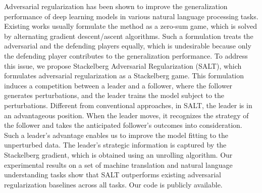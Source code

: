 Adversarial regularization has been shown to improve the generalization performance of deep learning models in various natural language processing tasks. Existing works usually formulate the method as a zero-sum game, which is solved by alternating gradient descent/ascent algorithms. Such a formulation treats the adversarial and the defending players equally, which is undesirable because only the defending player contributes to the generalization performance. To address this issue, we propose Stackelberg Adversarial Regularization (SALT), which formulates adversarial regularization as a Stackelberg game. This formulation induces a competition between a leader and a follower, where the follower generates perturbations, and the leader trains the model subject to the perturbations. Different from conventional approaches, in SALT, the leader is in an advantageous position. When the leader moves, it recognizes the strategy of the follower and takes the anticipated follower's outcomes into consideration. Such a leader's advantage enables us to improve the model fitting to the unperturbed data. The leader's strategic information is captured by the Stackelberg gradient, which is obtained using an unrolling algorithm. Our experimental results on a set of machine translation and natural language understanding tasks show that SALT outperforms existing adversarial regularization baselines across all tasks. Our code is publicly available.
